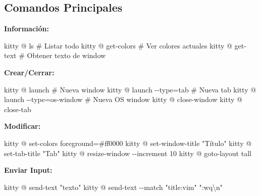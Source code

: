 \documentclass[
  doc,
  floatsintext,
  longtable,
  a4paper,
  nolmodern,
  notxfonts,
  notimes,
  12pt,
  colorlinks=true,linkcolor=blue,citecolor=blue,urlcolor=blue]{apa7}
\newenvironment{Shaded}{\begin{snugshade}}{\end{snugshade}}
\newcommand{\AttributeTok}[1]{\textcolor[rgb]{0.40,0.45,0.13}{#1}}
\newcommand{\CommentTok}[1]{\textcolor[rgb]{0.37,0.37,0.37}{#1}}
\newcommand{\ExtensionTok}[1]{\textcolor[rgb]{0.00,0.23,0.31}{#1}}
\newcommand{\NormalTok}[1]{\textcolor[rgb]{0.00,0.23,0.31}{#1}}
\newcommand{\OperatorTok}[1]{\textcolor[rgb]{0.37,0.37,0.37}{#1}}
\newcommand{\StringTok}[1]{\textcolor[rgb]{0.13,0.47,0.30}{#1}}
\begin{document}
\subsection{Comandos Principales}\label{comandos-principales}

\textbf{Información:}

\begin{Shaded}
\begin{Highlighting}[]
\ExtensionTok{kitty}\NormalTok{ @ ls                    }\CommentTok{\# Listar todo}
\ExtensionTok{kitty}\NormalTok{ @ get{-}colors            }\CommentTok{\# Ver colores actuales}
\ExtensionTok{kitty}\NormalTok{ @ get{-}text              }\CommentTok{\# Obtener texto de window}
\end{Highlighting}
\end{Shaded}

\textbf{Crear/Cerrar:}

\begin{Shaded}
\begin{Highlighting}[]
\ExtensionTok{kitty}\NormalTok{ @ launch                }\CommentTok{\# Nueva window}
\ExtensionTok{kitty}\NormalTok{ @ launch }\AttributeTok{{-}{-}type}\OperatorTok{=}\NormalTok{tab     }\CommentTok{\# Nueva tab}
\ExtensionTok{kitty}\NormalTok{ @ launch }\AttributeTok{{-}{-}type}\OperatorTok{=}\NormalTok{os{-}window  }\CommentTok{\# Nueva OS window}
\ExtensionTok{kitty}\NormalTok{ @ close{-}window}
\ExtensionTok{kitty}\NormalTok{ @ close{-}tab}
\end{Highlighting}
\end{Shaded}

\textbf{Modificar:}

\begin{Shaded}
\begin{Highlighting}[]
\ExtensionTok{kitty}\NormalTok{ @ set{-}colors foreground=\#ff0000}
\ExtensionTok{kitty}\NormalTok{ @ set{-}window{-}title }\StringTok{"Título"}
\ExtensionTok{kitty}\NormalTok{ @ set{-}tab{-}title }\StringTok{"Tab"}
\ExtensionTok{kitty}\NormalTok{ @ resize{-}window }\AttributeTok{{-}{-}increment}\NormalTok{ 10}
\ExtensionTok{kitty}\NormalTok{ @ goto{-}layout tall}
\end{Highlighting}
\end{Shaded}

\textbf{Enviar Input:}

\begin{Shaded}
\begin{Highlighting}[]
\ExtensionTok{kitty}\NormalTok{ @ send{-}text }\StringTok{"texto"}
\ExtensionTok{kitty}\NormalTok{ @ send{-}text }\AttributeTok{{-}{-}match} \StringTok{"title:vim"} \StringTok{":wq\textbackslash{}n"}
\end{Highlighting}
\end{Shaded}
\end{document}
